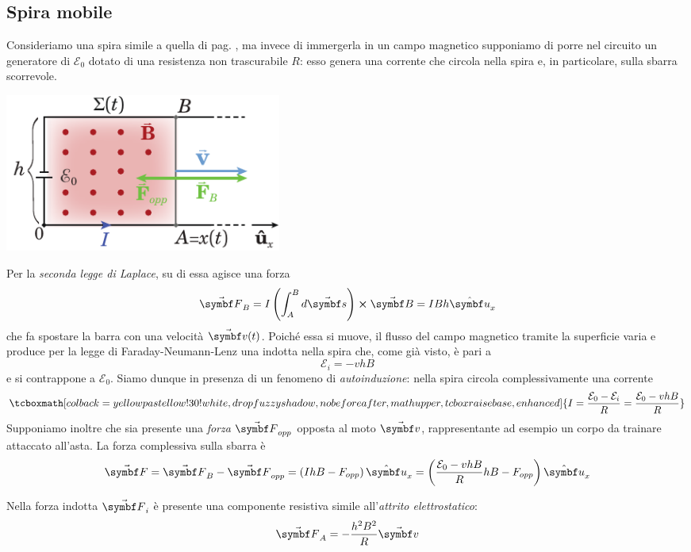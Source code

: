 \subsection{Spira mobile}
Consideriamo una spira simile a quella di pag. \pageref{spiramobilegeneratori}, ma invece di immergerla in un campo magnetico supponiamo di porre nel circuito un generatore di \fem $\mathcal{E}_0$ dotato di una resistenza non trascurabile $R$: esso genera una corrente che circola nella spira e, in particolare, sulla sbarra scorrevole.
\begin{center}
	\includegraphics[width=0.4\textwidth]{images/chp11/chp11motorespira.pdf}
\end{center}
Per la \textit{seconda legge di Laplace}, su di essa agisce una forza
\begin{equation*}
	\vba{F}_B=I\left(\int_{A}^{B}d\vba{s}\right)\cross\vba{B}=IBh\vbh{u}_x
\end{equation*}
che fa spostare la barra con una velocità $\vba{v}(t)$. Poiché essa si muove, il flusso del campo magnetico tramite la superficie varia e produce per la legge di Faraday-Neumann-Lenz una \fem indotta nella spira che, come già visto, è pari a
\begin{equation*}
	\mathcal{E}_{i}=-vhB
\end{equation*}
e si contrappone a $\mathcal{E}_0$. Siamo dunque in presenza di un fenomeno di \textit{autoinduzione}: nella spira circola complessivamente una corrente
\begin{equation}
	\tcboxmath[colback=yellowpastellow!30!white,drop fuzzy shadow, nobeforeafter, math upper, tcbox raise base, enhanced]{I=\frac{\mathcal{E}_0-\mathcal{E}_i}{R}=\frac{\mathcal{E}_0-vhB}{R}}
\end{equation}
Supponiamo inoltre che sia presente una \textit{forza} $\vba{F}_{opp}$ opposta al moto $\vba{v}$, rappresentante ad esempio un corpo da trainare attaccato all'asta. La forza complessiva sulla sbarra è
\begin{equation*}
	\vba{F}=\vba{F}_B-\vba{F}_{opp}=\left(IhB-F_{opp}\right)\vbh{u}_x=\left(\frac{\mathcal{E}_0-vhB}{R}hB-F_{opp}\right)\vbh{u}_x
\end{equation*}
\begin{observe}
	Nella forza indotta $\vba{F}_i$ è presente una componente resistiva simile all'\textit{attrito elettrostatico}:
	\begin{equation*}
		\vba{F}_A=-\frac{h^2B^2}{R}\vba{v}
	\end{equation*}
\end{observe}
